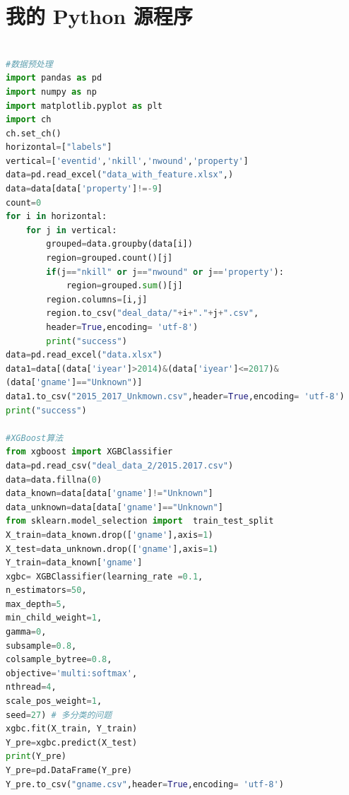 \documentclass[bwprint]{gmcmthesis}
\begin{document}


\newpage





\newpage
\appendix
\section{我的 Python 源程序}
\begin{lstlisting}[language=Python]%设置不同语言即可。

#数据预处理
import pandas as pd
import numpy as np
import matplotlib.pyplot as plt
import ch
ch.set_ch()
horizontal=["labels"]
vertical=['eventid','nkill','nwound','property']
data=pd.read_excel("data_with_feature.xlsx",)
data=data[data['property']!=-9]
count=0
for i in horizontal:
    for j in vertical:
        grouped=data.groupby(data[i])
        region=grouped.count()[j]
        if(j=="nkill" or j=="nwound" or j=='property'):
            region=grouped.sum()[j]
        region.columns=[i,j]
        region.to_csv("deal_data/"+i+"."+j+".csv",
        header=True,encoding= 'utf-8')
        print("success")
data=pd.read_excel("data.xlsx")
data1=data[(data['iyear']>2014)&(data['iyear']<=2017)&
(data['gname']=="Unknown")]
data1.to_csv("2015_2017_Unkmown.csv",header=True,encoding= 'utf-8')
print("success")

#XGBoost算法
from xgboost import XGBClassifier
data=pd.read_csv("deal_data_2/2015.2017.csv")
data=data.fillna(0)
data_known=data[data['gname']!="Unknown"]
data_unknown=data[data['gname']=="Unknown"]
from sklearn.model_selection import  train_test_split
X_train=data_known.drop(['gname'],axis=1)
X_test=data_unknown.drop(['gname'],axis=1)
Y_train=data_known['gname']
xgbc= XGBClassifier(learning_rate =0.1,
n_estimators=50,
max_depth=5,
min_child_weight=1,
gamma=0,
subsample=0.8,
colsample_bytree=0.8,
objective='multi:softmax',
nthread=4,
scale_pos_weight=1,
seed=27) # 多分类的问题
xgbc.fit(X_train, Y_train)
Y_pre=xgbc.predict(X_test)
print(Y_pre)
Y_pre=pd.DataFrame(Y_pre)
Y_pre.to_csv("gname.csv",header=True,encoding= 'utf-8')


\end{lstlisting}
\end{document}
